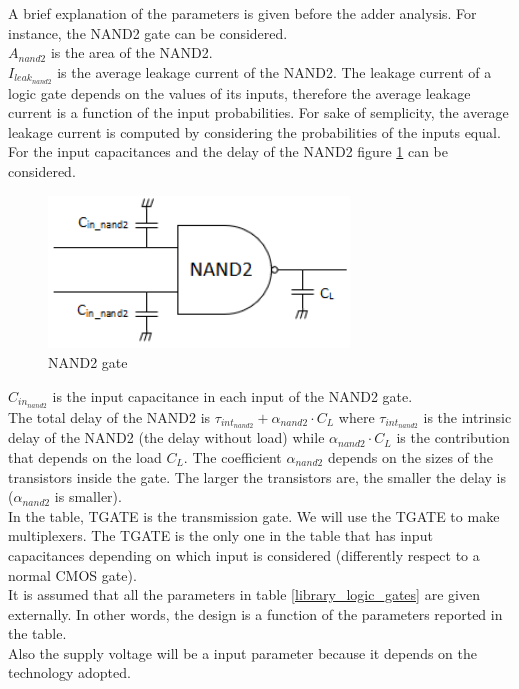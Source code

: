 A brief explanation of the parameters is given before the adder analysis. For instance, the NAND2 gate can be considered. \\
$A_{nand2}$ is the area of the NAND2.\\
$I_{leak_{nand2}}$ is the average leakage current of the NAND2. The leakage current of a logic gate depends on the values of its inputs, therefore the average leakage current is a function of the input probabilities. For sake of semplicity, the average leakage current is computed by considering the probabilities of the inputs equal.\\
For the input capacitances and the delay of the NAND2 figure \ref{NAND2_gate} can be considered.

\begin{figure}[H]
\centering
\includegraphics[width = 8cm]{pentium/nand2.png}
\caption{NAND2 gate}
\label{NAND2_gate}
\end{figure}

$C_{in_{nand2}}$ is the input capacitance in each input of the NAND2 gate.\\
The total delay of the NAND2 is 
$\tau_{int_{nand2}}+\alpha_{nand2}\cdot C_L$ where $\tau_{int_{nand2}}$ is the intrinsic delay of the NAND2 (the delay without load) while $\alpha_{nand2}\cdot C_L$ is the contribution that depends on the load $C_L$. The coefficient $\alpha_{nand2}$ depends on the sizes of the transistors inside the gate. The larger the transistors are, the smaller the delay is ($\alpha_{nand2}$ is smaller).\\
In the table, TGATE is the transmission gate. We will use the TGATE to make multiplexers. The TGATE is the only one in the table that has input capacitances depending on which input is considered (differently respect to a normal CMOS gate).\\
It is assumed that all the parameters in table  \ref{library_logic_gates} are given externally. In other words, the design is a function of the parameters reported in the table.\\
Also the supply voltage will be a input parameter because it depends on the technology adopted.\\





